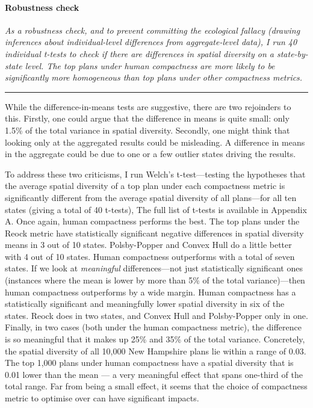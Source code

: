 \documentclass[]{article}
\let\oldparagraph\paragraph
\renewcommand{\paragraph}[1]{\oldparagraph{#1}\mbox{}}
\begin{document}
\hypertarget{robustness-check-2}{%
\paragraph{Robustness check}\label{robustness-check-2}}

\textsl{As a robustness check, and to prevent committing the ecological fallacy
(drawing inferences about individual-level differences from aggregate-level
data), I run 40 individual t-tests to check if there are differences in spatial
diversity on a state-by-state level. The top plans under human compactness are
more likely to be significantly more homogeneous than top plans under other
compactness metrics.}

\begin{center}\rule{0.5\linewidth}{\linethickness}\end{center}

While the difference-in-means tests are suggestive, there are two
rejoinders to this. Firstly, one could argue that the difference in
means is quite small: only 1.5\% of the total variance in spatial
diversity. Secondly, one might think that looking only at the aggregated
results could be misleading. A difference in means in the aggregate
could be due to one or a few outlier states driving the results.

To address these two criticisms, I run Welch's t-test---testing the
hypotheses that the average spatial diversity of a top plan under each
compactness metric is significantly different from the average spatial
diversity of all plans---for all ten states (giving a total of 40
t-tests), The full list of t-tests is available in Appendix A. Once
again, human compactness performs the best. The top plans under the
Reock metric have statistically significant negative differences in
spatial diversity means in 3 out of 10 states. Polsby-Popper and Convex
Hull do a little better with 4 out of 10 states. Human compactness
outperforms with a total of seven states. If we look at
\emph{meaningful} differences---not just statistically significant ones
(instances where the mean is lower by more than 5\% of the total
variance)---then human compactness outperforms by a wide margin. Human
compactness has a statistically significant and meaningfully lower
spatial diversity in six of the states. Reock does in two states, and
Convex Hull and Polsby-Popper only in one. Finally, in two cases (both
under the human compactness metric), the difference is so meaningful
that it makes up 25\% and 35\% of the total variance. Concretely, the
spatial diversity of all 10,000 New Hampshire plans lie within a range
of 0.03. The top 1,000 plans under human compactness have a spatial
diversity that is 0.01 lower than the mean --- a very meaningful effect
that spans one-third of the total range. Far from being a small effect,
it seems that the choice of compactness metric to optimise over can have
significant impacts.
\end{document}
